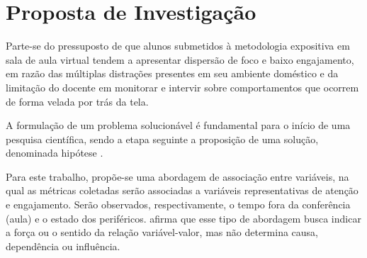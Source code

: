 \section{Proposta de Investigação}
Parte-se do pressuposto de que alunos submetidos à metodologia expositiva em sala de aula virtual tendem a apresentar dispersão de foco e baixo engajamento, em razão das múltiplas distrações presentes em seu ambiente doméstico e da limitação do docente em monitorar e intervir sobre comportamentos que ocorrem de forma velada por trás da tela.

A formulação de um problema solucionável é fundamental para o início de uma pesquisa científica, sendo a etapa seguinte a proposição de uma solução, denominada hipótese \cite{gilComoElaborarProjetos2008a}.

Para este trabalho, propõe-se uma abordagem de associação entre variáveis, na qual as métricas coletadas serão associadas a variáveis representativas de atenção e engajamento. Serão observados, respectivamente, o tempo fora da conferência (aula) e o estado dos periféricos.  afirma que esse tipo de abordagem busca indicar a força ou o sentido da relação variável-valor, mas não determina causa, dependência ou influência.